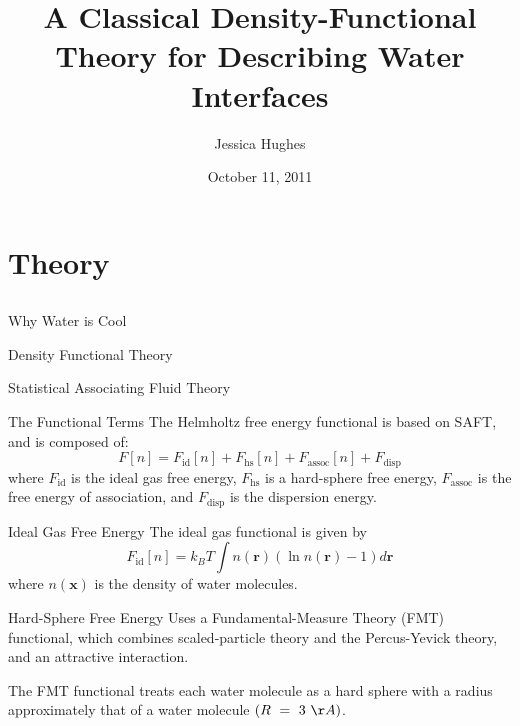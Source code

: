 \documentclass{beamer}
\title{A Classical Density-Functional Theory for Describing Water Interfaces}
\author{Jessica Hughes}
\date{October 11, 2011}
\begin{document}
\begin{frame}
  \titlepage
\end{frame}

\section{Theory}
\subsection*{}

\begin{frame}{Why Water is Cool}
\end{frame}

\begin{frame}{Density Functional Theory}
\end{frame}

\begin{frame}{Statistical Associating Fluid Theory}
\end{frame}

\begin{frame}[fragile]{The Functional Terms}
The Helmholtz free energy functional is
based on SAFT, and is composed of:
\begin{equation}
  F[n] = F_\text{id}[n] + F_\text{hs}[n] + F_\text{assoc}[n] + F_\text{disp}
\end{equation}
where $F_\text{id}$ is the ideal gas free energy, $F_\text{hs}$ is
a hard-sphere free energy, $F_\text{assoc}$ is the free energy of
association, and $F_\text{disp}$ is the dispersion energy. 
\end{frame}

\begin{frame}[fragile]{Ideal Gas Free Energy}
The ideal gas functional is given by
\begin{equation}
  F_\text{id}[n] = k_B T \int n(\textbf{r})\left( \ln{n(\textbf{r})} - 1\right) d\textbf{r}
\end{equation}
where $n(\textbf{x})$ is the density of water molecules.  
\end{frame}

\begin{frame}[fragile]{Hard-Sphere Free Energy}
Uses a Fundamental\nobreakdash-Measure Theory (FMT) functional,
which combines scaled-particle theory and the Percus-Yevick theory,
and an attractive interaction.  

The FMT functional treats
each water molecule as a hard sphere with a radius approximately that of
a water molecule $(R~=~3~\AA)$.
\end{frame}
 
\end{document}
